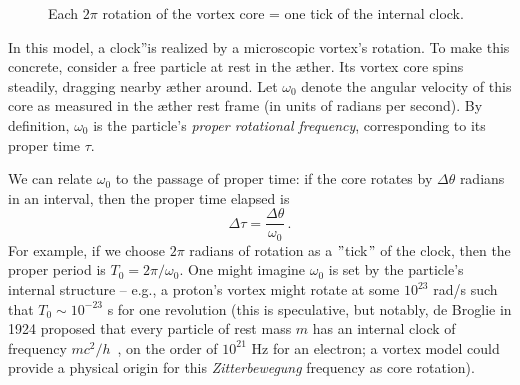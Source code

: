 \documentclass[a4paper,12pt]{article}
\begin{document}
\begin{figure}[H]
    \centering
    \caption{Each $2\pi$ rotation of the vortex core = one tick of the internal clock.}
    \label{fig:wervelklok}
\end{figure}

In this model, a \grqq clock\textquotedblright is realized by a microscopic vortex's rotation. To make this concrete, consider a free particle at rest in the æther. Its vortex core spins steadily, dragging nearby æther around. Let $\omega_0$ denote the angular velocity of this core as measured in the æther rest frame (in units of radians per second). By definition, $\omega_0$ is the particle's \emph{proper rotational frequency}, corresponding to its proper time $\tau$.

We can relate $\omega_0$ to the passage of proper time: if the core rotates by $\Delta \theta$ radians in an interval, then the proper time elapsed is
\[
\Delta \tau = \frac{\Delta \theta}{\omega_0} \,.
\]
For example, if we choose $2\pi$ radians of rotation as a \("\)tick\("\) of the clock, then the proper period is $T_0 = 2\pi/\omega_0$. One might imagine $\omega_0$ is set by the particle's internal structure – e.g., a proton's vortex might rotate at some $10^{23}$ rad/s such that $T_0 \sim 10^{-23}$ s for one revolution (this is speculative, but notably, de Broglie in 1924 proposed that every particle of rest mass $m$ has an internal clock of frequency $mc^2/h$~\cite{deBroglie1924-frequency}, on the order of $10^{21}$ Hz for an electron; a vortex model could provide a physical origin for this \emph{Zitterbewegung} frequency as core rotation).
\end{document}
